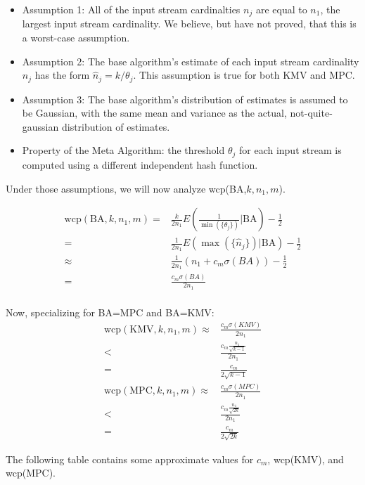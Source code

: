 \documentclass{sig-alternate}
\begin{document}
\begin{itemize}
\item Assumption 1: All of the input stream cardinalties $n_j$ are equal to $n_1$, the largest input stream
cardinality. We believe, but have not proved, that this is a worst-case assumption.
\item Assumption 2: The base algorithm's estimate of each input stream cardinality $n_j$ 
has the form $\hat{n}_j = k / \theta_j$. This assumption is true for both KMV and MPC.
\item Assumption 3: The base algorithm's distribution of estimates is assumed to be Gaussian,
with the same mean and variance as the actual, not-quite-gaussian distribution of estimates.
\item Property of the Meta Algorithm: the threshold $\theta_j$ for each input stream is computed using a different independent hash function.
\end{itemize}

Under those assumptions, we will now analyze wcp(BA,$k,n_1,m$).

\begin{align}
   \mathrm{wcp}(\mathrm{BA},k,n_1,m) 
= & \frac{k}{2n_1} E\left( \frac{1}{\min(\{\theta_j\})} | \mathrm{BA} \right) - \frac{1}{2} \\
= & \frac{1}{2n_1} E ( \max ( \{ \hat{n}_j \} ) | \mathrm{BA} ) - \frac{1}{2} \\
\approx & \frac{1}{2n_1}  (n_1 + c_m \sigma(BA))    - \frac{1}{2}  \\
= & \frac{c_m \sigma(BA)}{2n_1} \\
\end{align}

\noindent Now, specializing for BA=MPC and BA=KMV:
\begin{align}
\mathrm{wcp}(\mathrm{KMV},k,n_1,m)
\approx & \frac{c_m \sigma(KMV)}{2n_1} \\
        < & \frac{c_m \frac{n_1}{\sqrt{k-1}}}{2n_1} \\
        = & \frac{c_m}{2\sqrt{k\!-\!1}} \\
\mathrm{wcp}(\mathrm{MPC},k,n_1,m)
\approx & \frac{c_m \sigma(MPC)}{2n_1} \\
      < & \frac{c_m \frac{n_1}{\sqrt{2k}}}{2n_1} \\
      = & \frac{c_m}{2\sqrt{2k}}
\end{align}

The following table contains some approximate values for $c_m$, wcp(KMV), and
wcp(MPC).
\end{document}
